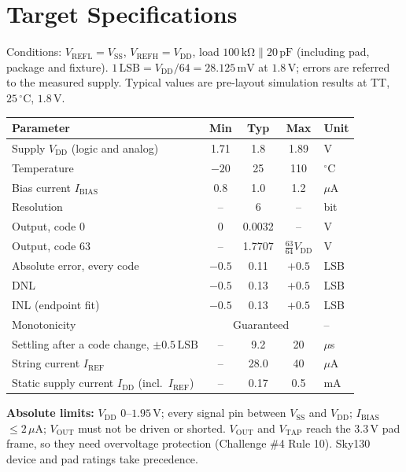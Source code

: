\documentclass[10pt,a4paper]{article}
\newcommand{\vrefh}{\ensuremath{V_{\mathrm{REFH}}}}
\newcommand{\vrefl}{\ensuremath{V_{\mathrm{REFL}}}}
\newcommand{\vtap}{\ensuremath{V_{\mathrm{TAP}}}}
\newcommand{\vout}{\ensuremath{V_{\mathrm{OUT}}}}
\newcommand{\vdd}{\ensuremath{V_{\mathrm{DD}}}}
\newcommand{\vssa}{\ensuremath{V_{\mathrm{SS}}}}
\newcommand{\ibias}{\ensuremath{I_{\mathrm{BIAS}}}}
\newcommand{\idd}{\ensuremath{I_{\mathrm{DD}}}}
\newcommand{\iref}{\ensuremath{I_{\mathrm{REF}}}}
\begin{document}
\section{Target Specifications}
Conditions: $\vrefl = \vssa$, $\vrefh = \vdd$, load $100\,\mathrm{k\Omega} \parallel 20\,\mathrm{pF}$ (including pad, package and fixture). $1\,\mathrm{LSB} = \vdd/64 = 28.125\,\mathrm{mV}$ at $1.8\,\mathrm{V}$; errors are referred to the measured supply. Typical values are pre-layout simulation results at TT, $25\,^\circ$C, $1.8\,\mathrm{V}$.
\begin{table}[H]
  \centering
  \begin{tabular}{@{}l c c c l@{}}
    \toprule
    \textbf{Parameter} & \textbf{Min} & \textbf{Typ} & \textbf{Max} & \textbf{Unit} \\
    \midrule
    Supply \vdd{} (logic and analog)      & 1.71  & 1.8   & 1.89  & V \\
    Temperature                           & $-20$ & 25    & 110   & $^\circ$C \\
    Bias current \ibias                   & 0.8   & 1.0   & 1.2   & $\mu$A \\
    Resolution                            & --    & 6     & --    & bit \\
    Output, code 0                        & 0     & 0.0032 & --   & V \\
    Output, code 63                       & --    & 1.7707 & $\tfrac{63}{64}\vdd$ & V \\
    Absolute error, every code            & $-0.5$ & 0.11 & $+0.5$ & LSB \\
    DNL                                   & $-0.5$ & 0.13 & $+0.5$ & LSB \\
    INL (endpoint fit)                    & $-0.5$ & 0.13 & $+0.5$ & LSB \\
    Monotonicity                          & \multicolumn{3}{c}{Guaranteed} & -- \\
    Settling after a code change, $\pm 0.5\,\mathrm{LSB}$ & -- & 9.2 & 20 & $\mu$s \\
    String current \iref                  & --    & 28.0  & 40    & $\mu$A \\
    Static supply current \idd{} (incl.\ \iref) & -- & 0.17 & 0.5 & mA \\
    \bottomrule
  \end{tabular}
\end{table}

\textbf{Absolute limits:} \vdd{} $0$--$1.95\,\mathrm{V}$; every signal pin between \vssa{} and \vdd{}; \ibias{} $\leq 2\,\mu\mathrm{A}$; \vout{} must not be driven or shorted. \vout{} and \vtap{} reach the $3.3\,\mathrm{V}$ pad frame, so they need overvoltage protection (Challenge \#4 Rule 10). Sky130 device and pad ratings take precedence.
\end{document}
